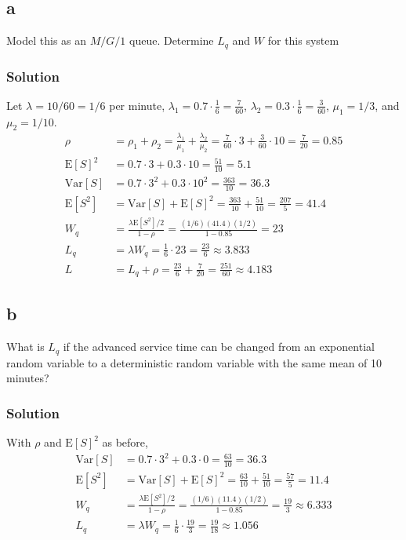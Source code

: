 \documentclass[letterpaper]{amsart}
\begin{document}
\subsection*{a}
Model this as an $M/G/1$ queue. Determine $L_q$ and $W$ for this system
\subsubsection*{Solution}
Let $\lambda = 10/60 = 1/6$ per minute,
$\lambda_1=0.7\cdot\frac{1}{6}=\frac{7}{60}$,
$\lambda_2=0.3\cdot\frac{1}{6}=\frac{3}{60}$,
$\mu_1=1/3$,
and $\mu_2=1/10$.
\begin{align*}
  \rho &= \rho_1 + \rho_2
         = \frac{\lambda_1}{\mu_1}
         + \frac{\lambda_2}{\mu_2}
         = \frac{7}{60}\cdot 3
         + \frac{3}{60}\cdot 10
         = \frac{7}{20} = 0.85 \\
  \text{E}[S]^2 &= 0.7\cdot 3 + 0.3\cdot 10 = \frac{51}{10} = 5.1 \\
  \text{Var}[S] &= 0.7\cdot 3^2 + 0.3\cdot 10^2 = \frac{363}{10} = 36.3 \\
  \text{E}[S^2] &= \text{Var}[S] + \text{E}[S]^2 = \frac{363}{10} + \frac{51}{10} = \frac{207}{5} = 41.4\\
  W_q&=\frac{\lambda\text{E}[S^2]/2}{1-\rho}
  = \frac{(1/6)(41.4)(1/2)}{1-0.85} = 23 \\
  L_q&=\lambda W_q = \frac{1}{6}\cdot 23 = \frac{23}{6} \approx 3.833 \\
  L &= L_q + \rho = \frac{23}{6} + \frac{7}{20} = \frac{251}{60} \approx 4.183
\end{align*}

\subsection*{b}
What is $L_q$ if the advanced service time can be changed from an
exponential random variable to a deterministic random variable with the
same mean of 10 minutes?
\subsubsection*{Solution}
With $\rho$ and $\text{E}[S]^2$ as before,
\begin{align*}
  \text{Var}[S] &= 0.7\cdot 3^2 + 0.3\cdot 0 = \frac{63}{10} = 36.3 \\
  \text{E}[S^2] &= \text{Var}[S] + \text{E}[S]^2 = \frac{63}{10} + \frac{51}{10} = \frac{57}{5} = 11.4\\
  W_q&=\frac{\lambda\text{E}[S^2]/2}{1-\rho}
  = \frac{(1/6)(11.4)(1/2)}{1-0.85} = \frac{19}{3}\approx 6.333 \\
  L_q&=\lambda W_q = \frac{1}{6}\cdot \frac{19}{3} = \frac{19}{18} \approx 1.056 \\
\end{align*}
\end{document}
